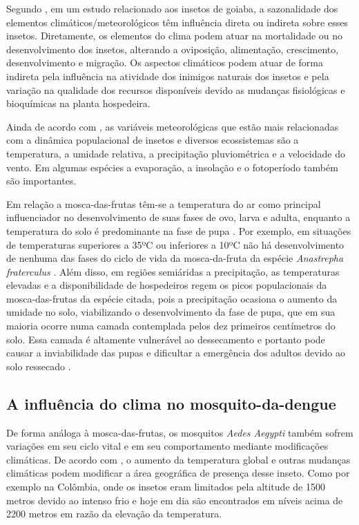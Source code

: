 Segundo , em um estudo relacionado aos insetos de goiaba, a sazonalidade dos elementos climáticos/meteorológicos têm influência direta ou indireta sobre esses insetos. Diretamente, os elementos do clima podem atuar na mortalidade ou no desenvolvimento dos insetos, alterando a oviposição, alimentação, crescimento, desenvolvimento e migração. Os aspectos climáticos podem atuar de forma indireta pela influência na atividade dos inimigos naturais dos insetos e pela variação na qualidade dos recursos disponíveis devido as mudanças fisiológicas e bioquímicas na planta hospedeira.

Ainda de acordo com , as variáveis meteorológicas que estão mais relacionadas com a dinâmica populacional de insetos e diversos ecossistemas são a temperatura, a umidade relativa, a precipitação pluviométrica e a velocidade do vento. Em algumas espécies a evaporação, a insolação e o fotoperíodo também são importantes.

Em relação a mosca-das-frutas têm-se a temperatura do ar como principal influenciador no desenvolvimento de suas fases de ovo, larva e adulta, enquanto a temperatura do solo é predominante na fase de pupa \cite{garcia1998influencia}. Por exemplo, em situações de temperaturas superiores a 35ºC ou inferiores a 10ºC não há desenvolvimento de nenhuma das fases do ciclo de vida da mosca-da-fruta da espécie \textit{Anastrepha fraterculus} \cite{araujo2008levantamento}. Além disso, em regiões semiáridas a precipitação, as temperaturas elevadas e a disponibilidade de hospedeiros regem os picos populacionais da mosca-das-frutas da espécie citada, pois a precipitação ocasiona o aumento da umidade no solo, viabilizando o desenvolvimento da fase de pupa, que em sua maioria ocorre numa camada contemplada pelos dez primeiros centímetros do solo. Essa camada é altamente vulnerável ao dessecamento e portanto pode causar a inviabilidade das pupas e dificultar a emergência dos adultos devido ao solo ressecado \cite{calore2013fatores, araujo2008levantamento}.

\subsection{A influência do clima no mosquito-da-dengue}

De forma análoga à mosca-das-frutas, os mosquitos \textit{Aedes Aegypti} também sofrem variações em seu ciclo vital e em seu comportamento mediante modificações climáticas. De acordo com , o aumento da temperatura global e outras mudanças climáticas podem modificar a área geográfica de presença desse inseto. Como por exemplo na Colômbia, onde os insetos eram limitados pela altitude de 1500 metros devido ao intenso frio e hoje em dia são encontrados em níveis acima de 2200 metros em razão da elevação da temperatura.
 
